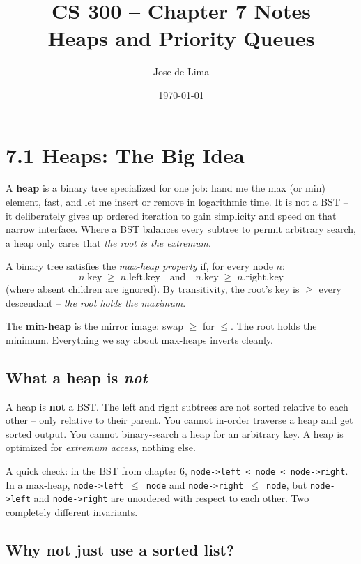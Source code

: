 \documentclass[11pt]{article}
\title{CS 300 -- Chapter 7 Notes\\\large Heaps and Priority Queues}
\author{Jose de Lima}
\date{\today}
\begin{document}
\maketitle

\section{7.1 Heaps: The Big Idea}

A \textbf{heap} is a binary tree specialized for one job: hand me the max (or min) element, fast, and let me insert or remove in logarithmic time. It is not a BST -- it deliberately gives up ordered iteration to gain simplicity and speed on that narrow interface. Where a BST balances every subtree to permit arbitrary search, a heap only cares that \emph{the root is the extremum}.

\begin{defnbox}
A binary tree satisfies the \emph{max-heap property} if, for every node $n$:
\[
n.\text{key} \;\ge\; n.\text{left}.\text{key}
\quad \text{and} \quad
n.\text{key} \;\ge\; n.\text{right}.\text{key}
\]
(where absent children are ignored). By transitivity, the root's key is $\ge$ every descendant -- \emph{the root holds the maximum}.
\end{defnbox}

The \textbf{min-heap} is the mirror image: swap $\ge$ for $\le$. The root holds the minimum. Everything we say about max-heaps inverts cleanly.

\subsection*{What a heap is \emph{not}}

\begin{warnbox}
A heap is \textbf{not} a BST. The left and right subtrees are not sorted relative to each other -- only relative to their parent. You cannot in-order traverse a heap and get sorted output. You cannot binary-search a heap for an arbitrary key. A heap is optimized for \emph{extremum access}, nothing else.
\end{warnbox}

A quick check: in the BST from chapter 6, \texttt{node->left < node < node->right}. In a max-heap, \texttt{node->left $\le$ node} and \texttt{node->right $\le$ node}, but \texttt{node->left} and \texttt{node->right} are unordered with respect to each other. Two completely different invariants.

\subsection*{Why not just use a sorted list?}
\end{document}
